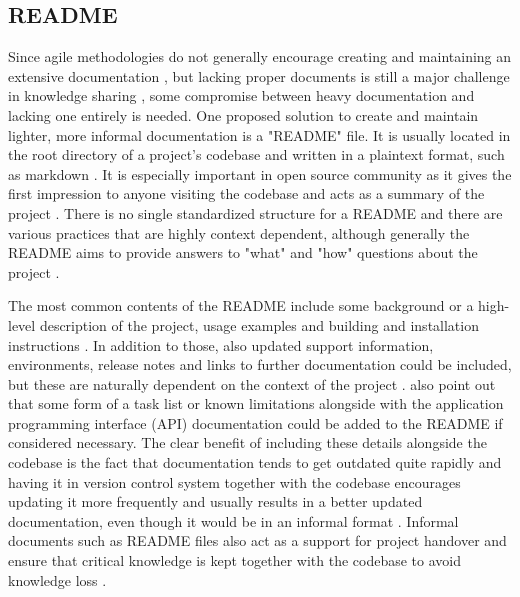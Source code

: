 \subsection{README}
\label{section:readme-theory}

Since agile methodologies do not generally encourage creating and maintaining an extensive documentation \citep{Basri2011}\citep{Gupta2013},
but lacking proper documents is still a major challenge in knowledge sharing \citep{Ersoy2015}, some compromise between heavy documentation and lacking one entirely is needed.
One proposed solution to create and maintain lighter, more informal documentation is a "README" file. It is usually located in the root directory of a project's codebase and written in a plaintext
format, such as markdown \citep{Karimzadeh2016}\citep{VanGompel2016}. It is especially important in open source community as it gives the first impression to anyone visiting the
codebase and acts as a summary of the project \citep{Karimzadeh2016}\citep{Prana2018}. There is no single standardized structure for a README and there are various practices that
are highly context dependent, although generally the README aims to provide answers to "what" and "how" questions about the project \citep{Prana2018}.

The most common contents of the README include some background or a high-level description of the project, usage examples and building and installation instructions
\citep{Ikeda2019}\citep{Karimzadeh2016}\citep{Prana2018}\citep{VanGompel2016}. In addition to those, also updated support information, environments, release notes and links to further documentation
could be included, but these are naturally dependent on the context of the project \citep{Ikeda2019}\citep{Karimzadeh2016}\citep{VanGompel2016}. \citet{Ikeda2019} also point out that
some form of a task list or known limitations alongside with the application programming interface (API) documentation could be added to the README if considered necessary. The clear benefit of
including these details alongside the codebase is the fact that documentation tends to get outdated quite rapidly and having it in version control system together with the codebase
encourages updating it more frequently and usually results in a better updated documentation, even though it would be in an informal format \citep{VanGompel2016}. Informal documents such as
README files also act as a support for project handover and ensure that critical knowledge is kept together with the codebase to avoid knowledge loss \citep{Stettina2013}.

